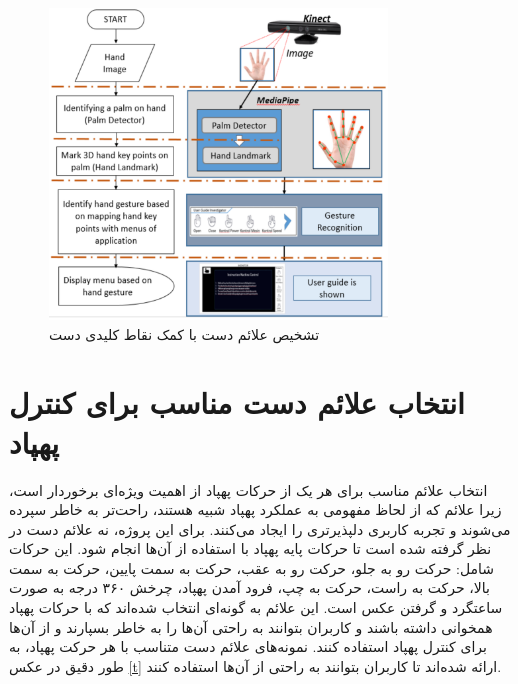 \begin{figure}[h]
    \centering
    \includegraphics[width=0.8\textwidth]{gesture.png}
    \caption[تشخیص علائم دست با کمک نقاط کلیدی دست]{تشخیص علائم دست با کمک نقاط کلیدی دست \cite{li2012hand}}
\end{figure}


\section{انتخاب علائم دست مناسب برای کنترل پهپاد}
انتخاب علائم‌ مناسب برای هر یک از حرکات پهپاد از اهمیت ویژه‌ای برخوردار است، زیرا علائم که از لحاظ مفهومی به عملکرد پهپاد شبیه هستند، راحت‌تر به خاطر سپرده می‌شوند و تجربه کاربری دلپذیرتری را ایجاد می‌کنند. برای این پروژه، نه علائم دست در نظر گرفته شده است تا حرکات پایه پهپاد با استفاده از آن‌ها انجام شود. 
این حرکات شامل: حرکت رو به جلو، حرکت رو به عقب، حرکت به سمت پایین، حرکت به سمت بالا،
حرکت به راست، حرکت به چپ، فرود آمدن پهپاد، چرخش ۳۶۰ درجه به صورت ساعتگرد و گرفتن عکس است.
این علائم به گونه‌ای انتخاب شده‌اند که با حرکات پهپاد همخوانی داشته باشند و کاربران بتوانند به راحتی آن‌ها را به خاطر بسپارند و از آن‌ها برای کنترل پهپاد استفاده کنند. نمونه‌های علائم دست متناسب با هر حرکت پهپاد، به طور دقیق در عکس \ref{t} ارائه شده‌اند تا کاربران بتوانند به راحتی از آن‌ها استفاده کنند.

